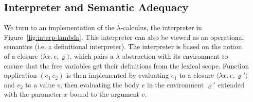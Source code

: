 \documentclass{tufte-handout}
\newcommand{\LAM}[1]{\lambda #1.\,}
\newcommand{\APP}[0]{\,}
\begin{document}




\subsection{Interpreter and Semantic Adequacy}

We turn to an implementation of the $\lambda$-calculus, the
interpreter in Figure~\ref{fig:interp-lambda}. This interpreter can
also be viewed as an operational semantics (i.e. a definitional
interpreter).  The interpreter is based on the notion of a closure
$\langle \LAM{x}e,\varrho \rangle$, which pairs a $\lambda$
abstraction with its environment to ensure that the free variables get
their definitions from the lexical scope.  Function application $(e_1
\APP e_2)$ is then implemented by evaluating $e_1$ to a closure
$\langle \LAM{x}e,\varrho' \rangle$ and $e_2$ to a value $v$, then
evaluating the body $e$ in the environment $\varrho'$ extended with
the parameter $x$ bound to the argument $v$.
\end{document}
